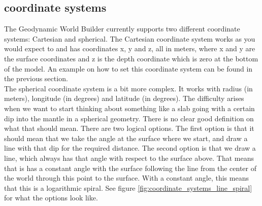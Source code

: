 \documentclass{book}
\newcommand{\GWB}{{Geodynamic World Builder}}
\begin{document}
\subsection{coordinate systems}
\label{section:coordinate_systems}
The \GWB{} currently supports two different coordinate systems: Cartesian and spherical. The Cartesian coordinate system works as you would expect to and has coordinates x, y and z, all in meters, where x and y are the surface coordinates and z is the depth coordinate which is zero at the bottom of the model. An example on how to set this coordinate system can be found in the previous section.
\\
The spherical coordinate system is a bit more complex. It works with radius (in meters), longitude (in degrees) and latitude (in degrees). The difficulty arises when we want to start thinking about something like a slab going with a certain dip into the mantle in a spherical geometry. There is no clear good definition on what that should mean. There are two logical options. The first option is that it should mean that we take the angle at the surface where we start, and draw a line with that dip for the required distance. The second option is that we draw a line, which always has that angle with respect to the surface above. That means that is has a constant angle with the surface following the line from the center of the world through this point to the surface. With a constant angle, this means that this is a logarithmic spiral. See figure \ref{fig:coordinate_systems_line_spiral} for what the options look like.
\end{document}
